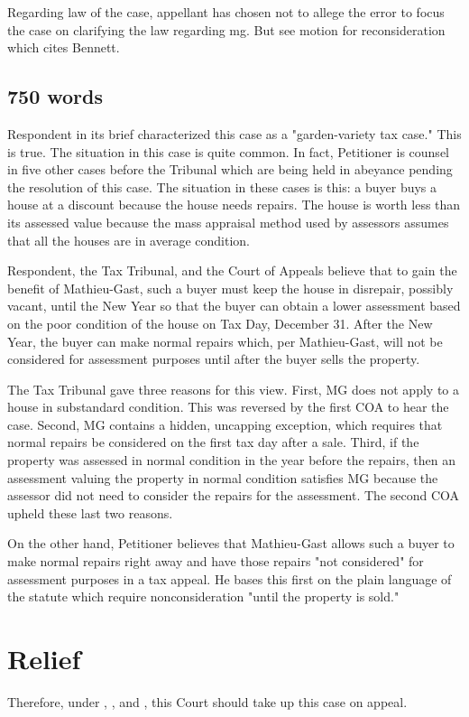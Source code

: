 Regarding law of the case, appellant has chosen not to allege the error to focus the case on clarifying the law regarding mg. But see motion for reconsideration which cites Bennett.

\subsection{750 words}
Respondent in its brief characterized this case as a "garden-variety tax case." This is true. The situation in this case is quite common. In fact, Petitioner is counsel in five other cases before the Tribunal which are being held in abeyance pending the resolution of this case. The situation in these cases is this: a buyer buys a house at a discount because the house needs repairs. The house is worth less than its assessed value because the mass appraisal method used by assessors assumes that all the houses are in average condition.

Respondent, the Tax Tribunal, and the Court of Appeals believe that to gain the benefit of Mathieu-Gast, such a buyer must keep the house in disrepair, possibly vacant, until the New Year so that the buyer can obtain a lower assessment based on the poor condition of the house on Tax Day, December 31. After the New Year, the buyer can make normal repairs which, per Mathieu-Gast, will not be considered for assessment purposes until after the buyer sells the property.

The Tax Tribunal gave three reasons for this view. First, MG does not apply to a house in substandard condition. This was reversed by the first COA to hear the case. Second, MG contains a hidden, uncapping exception, which requires that normal repairs be considered on the first tax day after a sale. Third, if the property was assessed in normal condition in the year before the repairs, then an assessment valuing the property in normal condition satisfies MG because the assessor did not need to consider the repairs for the assessment. The second COA upheld these last two reasons.

On the other hand, Petitioner believes that Mathieu-Gast allows such a buyer to make normal repairs right away and have those repairs "not considered" for assessment purposes in a tax appeal. He bases this first on the plain language of the statute which require nonconsideration "until the property is sold."

 


\section{Relief}

Therefore, under \cite{MCR 7.305(B)(3)}, \cite{MCR 7.305(B)(5)(a)}, and \cite{MCR 7.305(B)(5)(b)}, this Court should take up this case on appeal.
